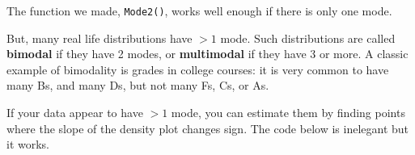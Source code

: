 \documentclass[
  13,
  letterpaper,
]{report}
\newenvironment{Shaded}{\begin{snugshade}}{\end{snugshade}}
\newcommand{\CommentTok}[1]{\textcolor[rgb]{0.37,0.37,0.37}{#1}}
\newcommand{\ControlFlowTok}[1]{\textcolor[rgb]{0.00,0.23,0.31}{\textbf{#1}}}
\newcommand{\DecValTok}[1]{\textcolor[rgb]{0.68,0.00,0.00}{#1}}
\newcommand{\FloatTok}[1]{\textcolor[rgb]{0.68,0.00,0.00}{#1}}
\newcommand{\FunctionTok}[1]{\textcolor[rgb]{0.28,0.35,0.67}{#1}}
\newcommand{\NormalTok}[1]{\textcolor[rgb]{0.00,0.23,0.31}{#1}}
\newcommand{\OtherTok}[1]{\textcolor[rgb]{0.00,0.23,0.31}{#1}}
\newcommand{\SpecialCharTok}[1]{\textcolor[rgb]{0.37,0.37,0.37}{#1}}
\begin{document}
The function we made, \texttt{Mode2()}, works well enough if there is
only one mode.

But, many real life distributions have \(>1\) mode. Such distributions
are called \textbf{bimodal} if they have 2 modes, or \textbf{multimodal}
if they have 3 or more. A classic example of bimodality is grades in
college courses: it is very common to have many Bs, and many Ds, but not
many Fs, Cs, or As.

If your data appear to have \(>1\) mode, you can estimate them by
finding points where the slope of the density plot changes sign. The
code below is inelegant but it works.

\begin{Shaded}
\end{Shaded}
\end{document}
